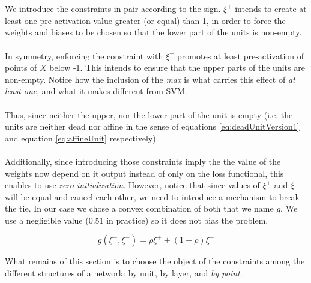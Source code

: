 \\\\
We introduce the constraints in pair according to the sign. $\xi^{+}$ intends to create at least one pre-activation value greater (or equal) than 1, in order to force the weights and biases to be chosen so that the lower part of the units is non-empty. 
\\\\
In symmetry, enforcing the constraint with $\xi^{-}$ promotes at least pre-activation of points of $X$ below -1. This intends to ensure that the upper parts of the units are non-empty. Notice how the inclusion of the \emph{max} is what carries this effect of \emph{at least one}, and what it makes different from SVM.
\\\\
Thus, since neither the upper, nor the lower part of the unit is empty (i.e. the units are neither dead nor affine in the sense of equations \ref{eq:deadUnitVersion1} and equation \ref{eq:affineUnit} respectively).
\\\\
Additionally, since introducing those constraints imply the the value of the weights now depend on it output instead of only on the loss functional, this enables to use \emph{zero-initialization}. However, notice that since values of $\xi^+$ and $\xi^-$ will be equal and cancel each other, we need to introduce a mechanism to break the tie. In our case we chose a convex combination of both that we name $g$. We use a negligible value (0.51 in practice) so it does not bias the problem.

\begin{equation}\label{eq:definitionOfRho}
    g(\xi^{+},\xi^{-}) = \rho\xi^{+}+(1-\rho)\xi^{-}
\end{equation}

What remains of this section is to choose the object of the constraints among the different structures of a network: by unit, by layer, and \emph{by point}.

